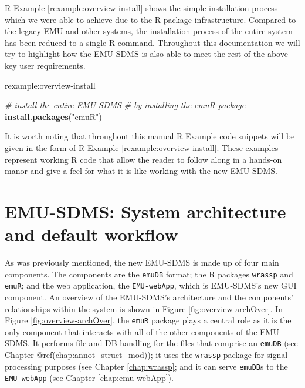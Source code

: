 \documentclass[]{book}
\newenvironment{Shaded}{\begin{snugshade}}{\end{snugshade}}
\newcommand{\CommentTok}[1]{\textcolor[rgb]{0.56,0.35,0.01}{\textit{#1}}}
\newcommand{\KeywordTok}[1]{\textcolor[rgb]{0.13,0.29,0.53}{\textbf{#1}}}
\newcommand{\NormalTok}[1]{#1}
\newcommand{\StringTok}[1]{\textcolor[rgb]{0.31,0.60,0.02}{#1}}
\theoremstyle{definition}
\theoremstyle{definition}
\theoremstyle{definition}
\theoremstyle{remark}
\begin{document}
R Example \ref{rexample:overview-install} shows the simple installation
process which we were able to achieve due to the R package
infrastructure. Compared to the legacy EMU and other systems, the
installation process of the entire system has been reduced to a single R
command. Throughout this documentation we will try to highlight how the
EMU-SDMS is also able to meet the rest of the above key user
requirements.

rexample:overview-install

\begin{Shaded}
\begin{Highlighting}[]
\CommentTok{# install the entire EMU-SDMS}
\CommentTok{# by installing the emuR package}
\KeywordTok{install.packages}\NormalTok{(}\StringTok{"emuR"}\NormalTok{)}
\end{Highlighting}
\end{Shaded}

It is worth noting that throughout this manual R Example code snippets
will be given in the form of R Example \ref{rexample:overview-install}.
These examples represent working R code that allow the reader to follow
along in a hands-on manor and give a feel for what it is like working
with the new EMU-SDMS.

\hypertarget{sec:overview-sysArch}{%
\section{EMU-SDMS: System architecture and default
workflow}\label{sec:overview-sysArch}}

As was previously mentioned, the new EMU-SDMS is made up of four main
components. The components are the \texttt{emuDB} format; the R packages
\texttt{wrassp} and \texttt{emuR}; and the web application, the
\texttt{EMU-webApp}, which is EMU-SDMS's new GUI component. An overview
of the EMU-SDMS's architecture and the components' relationships within
the system is shown in Figure \ref{fig:overview-archOver}. In Figure
\ref{fig:overview-archOver}, the \texttt{emuR} package plays a central
role as it is the only component that interacts with all of the other
components of the EMU-SDMS. It performs file and DB handling for the
files that comprise an \texttt{emuDB} (see Chapter
@ref(chap:annot\_struct\_mod)); it uses the \texttt{wrassp} package for
signal processing purposes (see Chapter \ref{chap:wrassp}; and it can
serve \texttt{emuDB}s to the \texttt{EMU-webApp} (see Chapter
\ref{chap:emu-webApp}).
\end{document}
